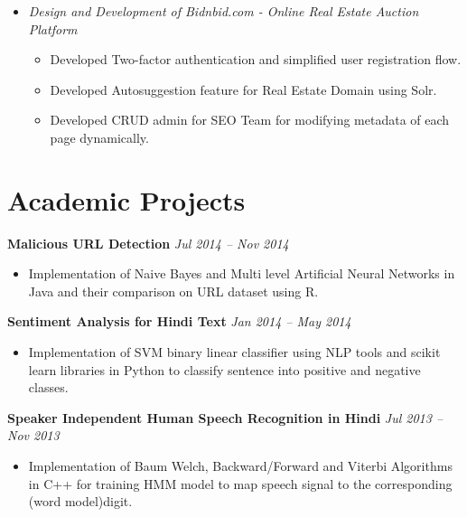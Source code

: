 \documentclass[margin,line]{resume}
\begin{document}
\begin{resume}
\begin{itemize}
    \item \textsl{Design and Development of Bidnbid.com - Online Real Estate Auction Platform}
        \begin{itemize}
            \item Developed​ Two-factor authentication​ and simplified user registration flow.
            \item Developed ​Autosuggestion ​feature for Real Estate Domain using Solr.
            \item Developed CRUD admin for SEO Team for modifying metadata of each page dynamically.
        \end{itemize}

    \end{itemize}

    
    \section{\mysidestyle Academic Projects}
    \textbf{Malicious URL Detection} \hfill \textsl{Jul 2014 -- Nov 2014} \vspace{0mm}\\\vspace{0mm}%
       \begin{itemize}
	        \item Implementation of Naive Bayes and Multi level Artificial Neural Networks in Java and their comparison on URL dataset using R.
       \end{itemize}
	\newpage
    \textbf{Sentiment Analysis for Hindi Text} \hfill \textsl{Jan 2014 -- May 2014} \vspace{0mm}\\\vspace{0mm}%
       \begin{itemize} 
            \item Implementation of SVM binary linear classifier using NLP tools and scikit learn libraries in Python to classify sentence into positive and negative classes.
       \end{itemize}


    \textbf{Speaker Independent Human Speech Recognition in Hindi} \hfill \textsl{Jul 2013 -- Nov 2013} \vspace{0mm}\\\vspace{0mm}%
       \begin{itemize}
            \item Implementation of Baum Welch, Backward/Forward and Viterbi Algorithms in C++ for training HMM model to map speech signal to the corresponding (word model)digit.
       \end{itemize}


\end{resume}
\end{document}
